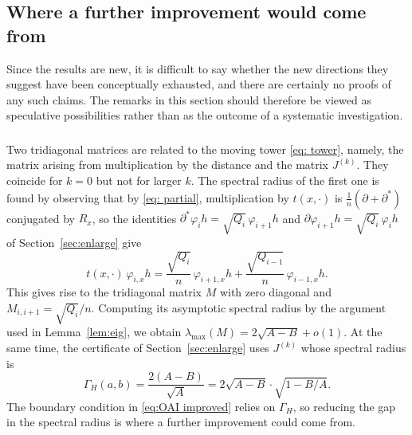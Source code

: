 \documentclass[11pt]{amsart}
\theoremstyle{plain}
\theoremstyle{remark}
\newcommand{\lmax}{\lambda_{\max}}
\begin{document}
\subsection{Where a further improvement would come from}
Since the results are new, it is difficult to say whether the new directions they suggest have been conceptually exhausted, and there are certainly no proofs of any such claims. The remarks in this section should therefore be viewed as speculative possibilities rather than as the outcome of a systematic investigation. 

\subsubsection{}\label{sec: two eigenvalues} Two tridiagonal matrices are related to the moving tower \eqref{eq: tower}, namely, the matrix arising from multiplication by the distance and the matrix $J^{(k)}$. They coincide for $k=0$ but not for larger $k$. The spectral radius of the first one is found by observing that by \eqref{eq: partial}, multiplication by $t(x,\cdot)$ is $\frac1n(\partial+\partial^{*})$ conjugated by $R_x$, so the identities
$\partial^{*}\varphi_ih=\sqrt{Q_i}\,\varphi_{i+1}h$ and
$\partial\varphi_{i+1}h=\sqrt{Q_i}\,\varphi_ih$ of Section~\ref{sec:enlarge}
give
\[
 t(x,\cdot)\,\varphi_{i,x}h
 =\frac{\sqrt{Q_i}}n\,\varphi_{i+1,x}h+\frac{\sqrt{Q_{i-1}}}n\,\varphi_{i-1,x}h.
\]
This gives rise to the tridiagonal matrix $M$ with zero diagonal and $M_{i,i+1}=\sqrt{Q_i}/n$. Computing its asymptotic spectral radius by the argument used in Lemma~\ref{lem:eig}, we obtain $\lmax(M)= 2\sqrt{A-B}+o(1)$. At the same time, the certificate of Section~\ref{sec:enlarge} uses $J^{(k)}$ whose spectral radius is 
\[
 \Gamma_H(a,b)=\frac{2(A-B)}{\sqrt A}=2\sqrt{A-B}\cdot\sqrt{1-B/A} .
\]
The boundary condition in \eqref{eq:OAI improved} relies on $\Gamma_H$, so reducing the gap in the spectral radius is where a further improvement could come from.
\end{document}
